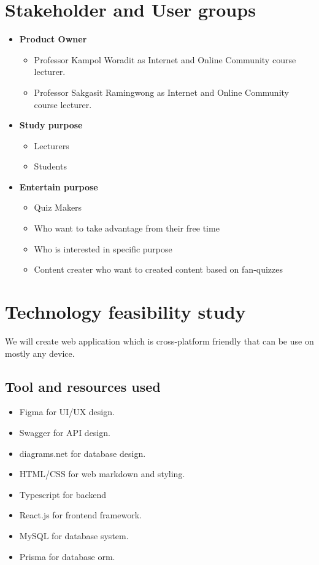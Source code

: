 \documentclass[ 10pt]{report}
\begin{document}
    \pagebreak
    \section{Stakeholder and User groups}
        \begin{itemize}
            \item \textbf{Product Owner}
            \begin{itemize}
                \item Professor Kampol Woradit as Internet and Online Community course lecturer. 
                \item Professor Sakgasit Ramingwong as Internet and Online Community course lecturer. 
            \end{itemize}
            \item \textbf{Study purpose}
            \begin{itemize}
                \item Lecturers
                \item Students
            \end{itemize}
            \item \textbf{Entertain purpose}
            \begin{itemize}
                \item Quiz Makers
                \item Who want to take advantage from their free time
                \item Who is interested in specific purpose
                \item Content creater who want to created content based on fan-quizzes
            \end{itemize}
        \end{itemize}
    

    \pagebreak
    \section{Technology feasibility study}
    We will create web application which is cross-platform friendly that can be use on mostly any device.

    \subsection{Tool and resources used}
    \begin{itemize}
        \item Figma for UI/UX design.
        \item Swagger for API design.
        \item diagrams.net for database design.
        \item HTML/CSS for web markdown and styling.
        \item Typescript for backend
        \item React.js for frontend framework.
        \item MySQL for database system.
        \item Prisma for database orm.
    \end{itemize}
\end{document}
